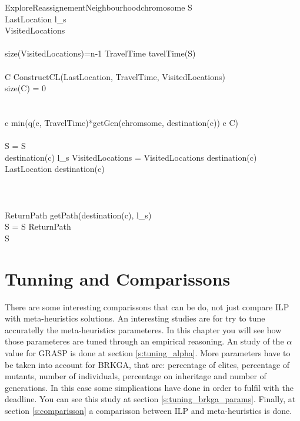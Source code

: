\documentclass[]{report}
\begin{document}
\begin{pseudocode}{ExploreReassignementNeighbourhood}{chromosome}
	\label{pc:brkga_decoder}
	S \GETS \varnothing\\
	LastLocation \GETS l_{s}\\
	VisitedLocations \GETS \varnothing\\
	\\
	\WHILE \NOT size(VisitedLocations)=n-1 \DO
	\BEGIN
	TravelTime \GETS tavelTime(S)\\
	\\
	C \GETS ConstructCL(LastLocation, TravelTime, VisitedLocations)\\
	\IF size(C) = 0 \THEN
	\\
	\\
	\\
	c \GETS min(q(c, TravelTime)*getGen(chromsome, destination(c)) \quad \forall c \in C)\\
	\\
	S = S \\
	\IF destination(c) \neq l_{s} \THEN
	VisitedLocations = VisitedLocations \cup destination(c)\\
	LastLocation \GETS destination(c)\\
	\END\\
	\\
	\\
	ReturnPath \GETS getPath(destination(c), l_{s})\\
	S = S \cup ReturnPath\\
	
	\RETURN S
\end{pseudocode}

\chapter{Tunning and Comparissons}\label{ch:comparisson}

There are some interesting comparissons that can be do, not just compare ILP with meta-heuristics solutions. An interesting studies are for try to tune accuratelly the meta-heuristics parameteres. In this chapter you will see how those parameteres are tuned through an empirical reasoning. An study of the $\alpha$ value for GRASP is done at section \ref{s:tuning_alpha}. More parameters have to be taken into account for BRKGA, that are: percentage of elites, percentage of mutants, number of individuals, percentage on inheritage and number of generations. In this case some simplications have done in order to fulfil with the deadline. You can see this study at section \ref{s:tuning_brkga_params}. Finally, at section \ref{s:comparisson} a comparisson between ILP and meta-heuristics is done.
\end{document}
